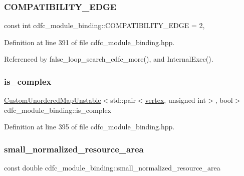 \subsubsection{\texorpdfstring{C\+O\+M\+P\+A\+T\+I\+B\+I\+L\+I\+T\+Y\+\_\+\+E\+D\+GE}{COMPATIBILITY\_EDGE}}
{\footnotesize\ttfamily const int cdfc\+\_\+module\+\_\+binding\+::\+C\+O\+M\+P\+A\+T\+I\+B\+I\+L\+I\+T\+Y\+\_\+\+E\+D\+GE = 2\hspace{0.3cm}{\ttfamily [static]}, {\ttfamily [protected]}}



Definition at line 391 of file cdfc\+\_\+module\+\_\+binding.\+hpp.



Referenced by false\+\_\+loop\+\_\+search\+\_\+cdfc\+\_\+more(), and Internal\+Exec().

\mbox{\label{classcdfc__module__binding_abfc4ddc64d944728b45427e1c7c05041}} 
\subsubsection{\texorpdfstring{is\+\_\+complex}{is\_complex}}
{\footnotesize\ttfamily \hyperlink{custom__map_8hpp_a8cbaceffc09790a885ec7e9c17809c69}{Custom\+Unordered\+Map\+Unstable}$<$std\+::pair$<$\hyperlink{graph_8hpp_abefdcf0544e601805af44eca032cca14}{vertex}, unsigned int$>$, bool$>$ cdfc\+\_\+module\+\_\+binding\+::is\+\_\+complex\hspace{0.3cm}{\ttfamily [protected]}}



Definition at line 395 of file cdfc\+\_\+module\+\_\+binding.\+hpp.

\mbox{\label{classcdfc__module__binding_ad5ab157aa37ee91f67cd6a92cb5b0845}} 
\subsubsection{\texorpdfstring{small\+\_\+normalized\+\_\+resource\+\_\+area}{small\_normalized\_resource\_area}}
{\footnotesize\ttfamily const double cdfc\+\_\+module\+\_\+binding\+::small\+\_\+normalized\+\_\+resource\+\_\+area\hspace{0.3cm}{\ttfamily [protected]}}



